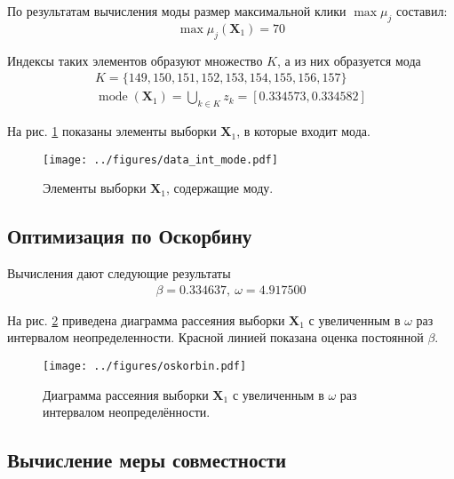 \documentclass[12pt]{article}
\DeclareMathOperator{\mode}{mode}
\begin{document}
	По результатам вычисления моды размер максимальной клики $\max \mu_j$ составил:
	\begin{equation*}
		\max \mu_j(\mathbf{X}_1)=70
	\end{equation*}

	Индексы таких элементов образуют множество $K$, а из них образуется мода
	\begin{equation*}
		\begin{gathered}
			K = \{149, 150, 151, 152, 153, 154, 155, 156, 157\}\\
			\mode (\mathbf{X}_1) = \bigcup\limits_{k\in K}z_k = [0.334573, 0.334582]
		\end{gathered}
	\end{equation*}

	На рис. \ref{fig:mode_int} показаны элементы выборки $\mathbf{X}_1$, в которые входит мода.
	\begin{figure}[H]
		\centering\texttt{[image: ../figures/data\_int\_mode.pdf]}
		\caption{Элементы выборки $\mathbf{X}_1$, содержащие моду.}
		\label{fig:mode_int}
	\end{figure}
	
	\subsection{Оптимизация по Оскорбину}
	
	Вычисления дают следующие результаты
	\begin{equation*}
		\begin{gathered}
			\beta = 0.334637,\ 
			\omega = 4.917500
		\end{gathered}
	\end{equation*}
	
	На рис. \ref{fig:oskorbin} приведена диаграмма рассеяния выборки $\mathbf{X}_1$ с увеличенным в $\omega$ раз интервалом неопределенности. Красной линией показана оценка постоянной $\beta$.
	
	\begin{figure}[H]
		\centering\texttt{[image: ../figures/oskorbin.pdf]}
		\caption{Диаграмма рассеяния выборки $\mathbf{X}_1$ с увеличенным в $\omega$ раз интервалом неопределённости.}
		\label{fig:oskorbin}
	\end{figure}

	\subsection{Вычисление меры совместности}
	
\end{document}
